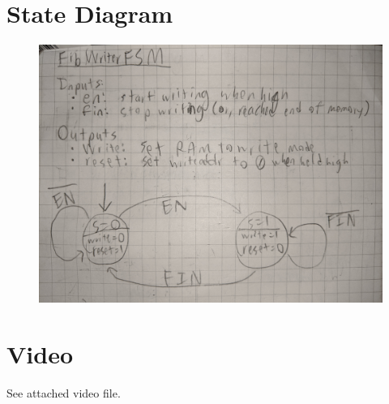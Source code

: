 \documentclass{article}
\begin{document}
\section{State Diagram}
\begin{figure}[H]
    \centering
    \includegraphics[width=\linewidth]{fsm-1.jpg}
\end{figure}

\section{Video}

See attached video file.
\end{document}
